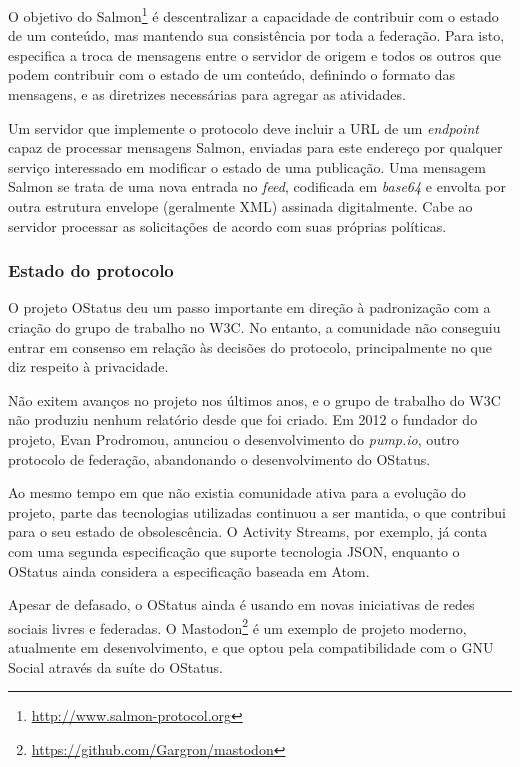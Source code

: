O objetivo do Salmon\footnote{\url{http://www.salmon-protocol.org}} é descentralizar
a capacidade de contribuir com o estado de um conteúdo, mas mantendo sua
consistência por toda a federação. Para isto, especifica a troca de mensagens entre
o servidor de origem e todos os outros que podem contribuir com o estado de um
conteúdo, definindo o formato das mensagens, e as diretrizes necessárias para
agregar as atividades.

Um servidor que implemente o protocolo deve incluir a URL de um \textit{endpoint}
capaz de processar mensagens Salmon, enviadas para este endereço por qualquer
serviço interessado em modificar o estado de uma publicação. Uma mensagem Salmon se
trata de uma nova entrada no \textit{feed}, codificada em \textit{base64} e envolta
por outra estrutura envelope (geralmente XML) assinada digitalmente. Cabe ao
servidor processar as solicitações de acordo com suas próprias políticas.

\subsubsection{Estado do protocolo}

O projeto OStatus deu um passo importante em direção à padronização com a criação do
grupo de trabalho no W3C. No entanto, a comunidade não conseguiu entrar em consenso
em relação às decisões do protocolo, principalmente no que diz respeito à
privacidade.

Não exitem avanços no projeto nos últimos anos, e o grupo de trabalho do W3C não
produziu nenhum relatório desde que foi criado. Em 2012 o fundador do projeto, Evan
Prodromou, anunciou o desenvolvimento do \textit{pump.io}, outro protocolo de
federação, abandonando o desenvolvimento do OStatus.

Ao mesmo tempo em que não existia comunidade ativa para a evolução do projeto, parte
das tecnologias utilizadas continuou a ser mantida, o que contribui para o seu
estado de obsolescência. O Activity Streams, por exemplo, já conta com uma segunda
especificação que suporte tecnologia JSON, enquanto o OStatus ainda considera a
especificação baseada em Atom.

Apesar de defasado, o OStatus ainda é usando em novas iniciativas de redes sociais
livres e federadas. O Mastodon\footnote{\url{https://github.com/Gargron/mastodon}} é
um exemplo de projeto moderno, atualmente em desenvolvimento, e que optou pela
compatibilidade com o GNU Social através da suíte do OStatus.


